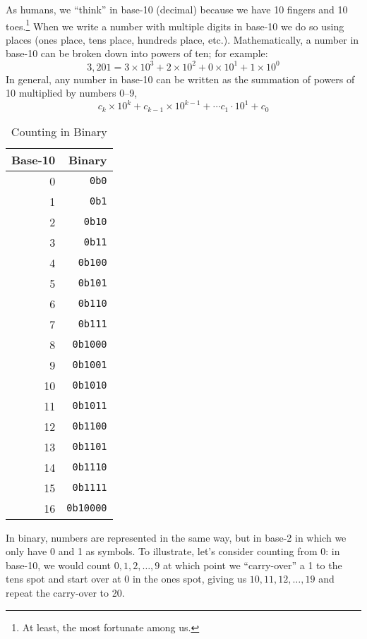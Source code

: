 As humans, we ``think'' in base-10 (decimal) because we have 10 fingers
and 10 toes.\footnote{At least, the most fortunate among us.}  When we write 
a number with multiple digits in base-10 we do so using places (ones place, 
tens place, hundreds place, etc.).  Mathematically, a number in base-10 
can be broken down into powers of ten; for example:
  $$3,201 = 3 \times 10^{3} + 2 \times 10^{2} + 0 \times 10^{1} + 1 \times 10^{0}$$
In general, any number in base-10 can be written as the summation of powers of 10
multiplied by numbers 0--9, 
  $$c_k \times 10^{k} + c_{k-1} \times 10^{k-1} + \cdots c_1 \cdot 10^{1} + c_0$$

\begin{wraptable}[22]{R}{0.40\textwidth}
\centering
\begin{tabular}{r|r}
Base-10 & Binary\\
\hline\hline
0 & \texttt{0b0} \\
1 & \texttt{0b1} \\
2 & \texttt{0b10} \\
3 & \texttt{0b11} \\
4 & \texttt{0b100} \\
5 & \texttt{0b101} \\
6 & \texttt{0b110} \\
7 & \texttt{0b111} \\
8 & \texttt{0b1000} \\
9 & \texttt{0b1001} \\
10 & \texttt{0b1010} \\
11 & \texttt{0b1011} \\
12 & \texttt{0b1100} \\
13 & \texttt{0b1101} \\
14 & \texttt{0b1110} \\
15 & \texttt{0b1111} \\
16 & \texttt{0b10000} \\
\end{tabular}
\caption{Counting in Binary}
\label{table:countingInBinary}
\end{wraptable}

In binary, numbers are represented in the same way, but in base-2 in which we only
have 0 and 1 as symbols.  To illustrate, let's consider counting from 0: in base-10, we
would count $0, 1, 2, \ldots, 9$ at which point we ``carry-over'' a 1 to the tens spot
and start over at 0 in the ones spot, giving us $10, 11, 12, \ldots, 19$ and repeat the
carry-over to 20.  

